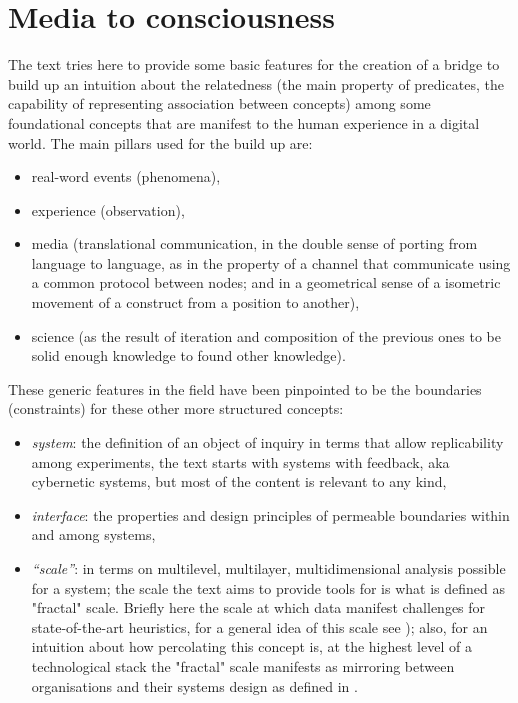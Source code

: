 \documentclass[14pt,a4paper]{extarticle}
\begin{document}
\section*{Media to consciousness}
\label{sec:media}%

\hspace*{15mm}The text tries here to provide some basic features for the creation of a bridge to build up an intuition about the relatedness (the main property of predicates, the capability of representing association between concepts) among some foundational concepts that are manifest to the human experience in a digital world. The main pillars used for the build up are:
\begin{itemize}
\item real-word events (phenomena),
\item experience (observation),
\item media (translational communication, in the double sense of porting from language to language, as in the property of a channel that communicate using a common protocol between nodes; and in a geometrical sense of a isometric movement of a construct from a position to another),
\item science (as the result of iteration and composition of the previous ones to be solid enough knowledge to found other knowledge).
\end{itemize}
These generic features in the field have been pinpointed to be the boundaries (constraints) for these other more structured concepts:

\begin{itemize}
\item \textit{system}: the definition of an object of inquiry in terms that allow replicability among experiments, the text starts with systems with feedback, aka cybernetic systems, but most of the content is relevant to any kind,
\item \textit{interface}: the properties and design principles of permeable boundaries within and among systems, 
\item \textit{“scale”}: in terms on multilevel, multilayer, multidimensional analysis possible for a system; the scale the text aims to provide tools for is what is defined as "fractal" scale. Briefly here the scale at which data manifest challenges for state-of-the-art heuristics, for a general idea of this scale see \cite{QuantaGraphs}); also, for an intuition about how percolating this concept is, at the highest level of a technological stack the "fractal" scale manifests as mirroring between organisations and their systems design as defined in \cite{Conway1967HOWDC}.
\end{itemize}
\end{document}
